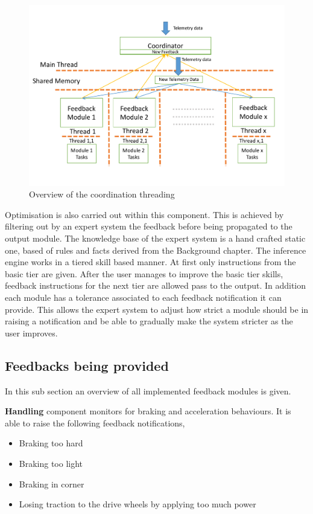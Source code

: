 \begin{figure}[!htb]
	\centering
	\includegraphics[width=\textwidth]{diagrams/multithreading.pdf}
	\caption{Overview of the coordination threading}
	\label{fig:multithreading}
\end{figure}

Optimisation is also carried out within this component. This is achieved by filtering out by an expert system the feedback before being propagated to the output module. The knowledge base of the expert system is a hand crafted static one, based of rules and facts derived from the Background chapter. The inference engine works in a tiered skill based manner. At first only instructions from the basic tier are given. After the user manages to improve the basic tier skills, feedback instructions for the next tier are allowed pass to the output. In addition each module has a tolerance associated to each feedback notification it can provide. This allows the expert system to adjust how strict a module should be in raising a notification and be able to gradually make the system stricter as the user improves.

\subsection{Feedbacks being provided}
In this sub section an overview of all implemented feedback modules is given.

\textbf{Handling} component monitors for braking and acceleration behaviours. It is able to raise the following feedback notifications, 
\begin{itemize}
	\item Braking too hard
	\item Braking too light
	\item Braking in corner
	\item Losing traction to the drive wheels by applying too much power
\end{itemize}

